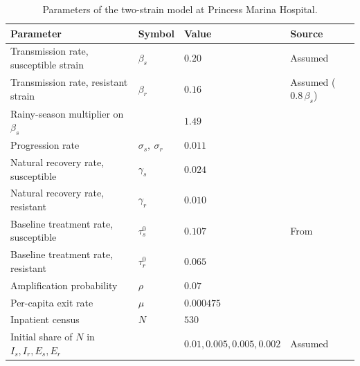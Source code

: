 \documentclass[11pt]{article}
\begin{document}
\begin{table}[!htbp]
\centering
\small
\caption{Parameters of the two-strain model at Princess Marina Hospital.}
\label{tab:seir-params}
\footnotesize
\begin{tabular}{llll}
\toprule
Parameter & Symbol & Value & Source \\
\midrule
Transmission rate, susceptible strain & $\beta_s$ & $0.20$ & Assumed \\
Transmission rate, resistant strain & $\beta_r$ & $0.16$ & Assumed ($0.8\,\beta_s$) \\
Rainy-season multiplier on $\beta_s$ & & $1.49$ & \citet{ntereke2026} \\
Progression rate & $\sigma_s,\ \sigma_r$ & $0.011$ & \citet{kd20} \\
Natural recovery rate, susceptible & $\gamma_s$ & $0.024$ & \citet{kd20} \\
Natural recovery rate, resistant & $\gamma_r$ & $0.010$ & \citet{kd20} \\
Baseline treatment rate, susceptible & $\tau_s^{0}$ & $0.107$ & From \citet{sejie2023} \\
Baseline treatment rate, resistant & $\tau_r^{0}$ & $0.065$ & \citet{kd20} \\
Amplification probability & $\rho$ & $0.07$ & \citet{kd20} \\
Per-capita exit rate & $\mu$ & $0.000475$ & \citet{statsbotswana2022} \\
Inpatient census & $N$ & $530$ & \citet{gezmu2020} \\
Initial share of $N$ in $I_s, I_r, E_s, E_r$ & & $0.01, 0.005, 0.005, 0.002$ & Assumed \\
\bottomrule
\end{tabular}
\end{table}
\end{document}
